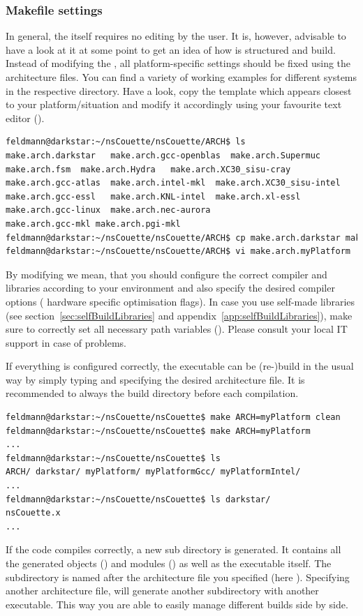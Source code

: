 \documentclass[a4paper, 11pt, DIV=11]{scrartcl}
\begin{document}
\subsubsection{Makefile settings}
\label{sec:makefile}

In general, the  itself requires no editing by the user.
It is, however, advisable to have a look at it at some point to get an
idea of how \nsc is structured and build. Instead of modifying the
, all platform-specific settings should be fixed using
the architecture files. You can find a variety of working examples for
different systems in the respective directory. Have a look, copy the
template which appears closest to your platform/situation and modify it
accordingly using your favourite text editor (\eg {}).
\begin{lstlisting}[language=bash]
feldmann@darkstar:~/nsCouette/nsCouette/ARCH$ ls
make.arch.darkstar   make.arch.gcc-openblas  make.arch.Supermuc
make.arch.fsm  make.arch.Hydra   make.arch.XC30_sisu-cray
make.arch.gcc-atlas  make.arch.intel-mkl  make.arch.XC30_sisu-intel
make.arch.gcc-essl   make.arch.KNL-intel  make.arch.xl-essl
make.arch.gcc-linux  make.arch.nec-aurora
make.arch.gcc-mkl make.arch.pgi-mkl
feldmann@darkstar:~/nsCouette/nsCouette/ARCH$ cp make.arch.darkstar make.arch.myPlatform
feldmann@darkstar:~/nsCouette/nsCouette/ARCH$ vi make.arch.myPlatform
\end{lstlisting}
By modifying we mean, that you should configure the correct compiler and libraries 
according to your environment and also specify the desired compiler options (\eg
hardware specific optimisation flags). In case you use self-made libraries (see 
section~\ref{sec:selfBuildLibraries} and appendix~\ref{app:selfBuildLibraries}),
make sure to correctly set all necessary path variables (\eg {}).
Please consult your local IT support in case of problems. 
\par
If everything is configured correctly, the executable can be (re-)build in the usual way by
simply typing  and specifying the desired architecture file. It is recommended 
to always  the build directory before each compilation. 
\begin{lstlisting}[language=bash]
feldmann@darkstar:~/nsCouette/nsCouette$ make ARCH=myPlatform clean
feldmann@darkstar:~/nsCouette/nsCouette$ make ARCH=myPlatform
...
feldmann@darkstar:~/nsCouette/nsCouette$ ls
ARCH/ darkstar/ myPlatform/ myPlatformGcc/ myPlatformIntel/
...
feldmann@darkstar:~/nsCouette/nsCouette$ ls darkstar/
nsCouette.x
...
\end{lstlisting}
If the code compiles correctly, a new sub directory is generated. It contains all the 
generated objects () and modules () as well as the executable 
 itself. The subdirectory is named after the architecture file you 
specified (here \eg {}). Specifying another architecture file, will
generate another subdirectory with another executable. This way you are able to easily 
manage different builds side by side. 
\end{document}
